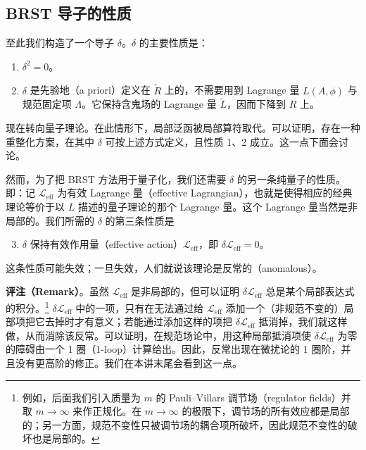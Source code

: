 
\subsection{BRST 导子的性质}

至此我们构造了一个导子 $\delta$。$\delta$ 的主要性质是：

\begin{enumerate}
  \item $\delta^2=0$。
  \item $\delta$ 是先验地（a priori）定义在 $\widetilde{R}$ 上的，不需要用到 Lagrange 量 $L(A,\phi)$ 与规范固定项 $\Lambda$。它保持含鬼场的 Lagrange 量 $\widetilde{L}$，因而下降到 $R$ 上。
\end{enumerate}

现在转向量子理论。在此情形下，局部泛函被局部算符取代。可以证明，存在一种重整化方案，在其中 $\delta$ 可按上述方式定义，且性质 1、2 成立。这一点下面会讨论。

然而，为了把 BRST 方法用于量子化，我们还需要 $\delta$ 的另一条纯量子的性质。即：记 $\mathcal{L}_{\mathrm{eff}}$ 为有效 Lagrange 量（effective Lagrangian），也就是使得相应的经典理论等价于以 $L$ 描述的量子理论的那个 Lagrange 量。这个 Lagrange 量当然是非局部的。我们所需的 $\delta$ 的第三条性质是

\begin{enumerate}
  \setcounter{enumi}{2}
  \item $\delta$ 保持有效作用量（effective action）$\mathcal{L}_{\mathrm{eff}}$，即 $\delta\mathcal{L}_{\mathrm{eff}}=0$。
\end{enumerate}

这条性质可能失效；一旦失效，人们就说该理论是反常的（anomalous）。

\textbf{评注（Remark）}。虽然 $\mathcal{L}_{\mathrm{eff}}$ 是非局部的，但可以证明 $\delta\mathcal{L}_{\mathrm{eff}}$ 总是某个局部表达式的积分。\footnote{例如，后面我们引入质量为 $m$ 的 Pauli–Villars 调节场（regulator fields）并取 $m\to\infty$ 来作正规化。在 $m\to\infty$ 的极限下，调节场的所有效应都是局部的；另一方面，规范不变性只被调节场的耦合项所破坏，因此规范不变性的破坏也是局部的。} $\delta\mathcal{L}_{\mathrm{eff}}$ 中的一项，只有在无法通过给 $\mathcal{L}_{\mathrm{eff}}$ 添加一个（非规范不变的）局部项把它去掉时才有意义；若能通过添加这样的项把 $\delta\mathcal{L}_{\mathrm{eff}}$ 抵消掉，我们就这样做，从而消除该反常。可以证明，在规范场论中，用这种局部抵消项使 $\delta\mathcal{L}_{\mathrm{eff}}$ 为零的障碍由一个 1 圈（1-loop）计算给出。因此，反常出现在微扰论的 1 圈阶，并且没有更高阶的修正。我们在本讲末尾会看到这一点。

